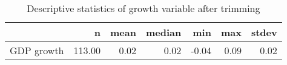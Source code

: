 \begin{table}[ht]
\centering
\begin{tabular}{rrrrrrr}
  \hline
 & n & mean & median & min & max & stdev \\ 
  \hline
GDP growth & 113.00 & 0.02 & 0.02 & -0.04 & 0.09 & 0.02 \\ 
   \hline
\end{tabular}
\caption{Descriptive statistics of growth variable after trimming} 
\label{gdpgrowth10stats}
\end{table}
